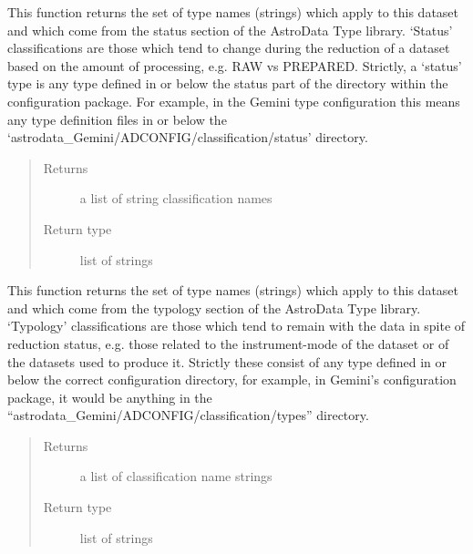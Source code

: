 \documentclass[letterpaper,10pt,english]{sphinxmanual}
\begin{document}

\begin{fulllineitems}
\label{chapter_AstroDataClass:astrodata.data.AstroData.get_status}
This function returns the set of type names (strings) which apply to
this dataset and which come from the status section of the AstroData
Type library. `Status' classifications are those which tend to change
during the reduction of a dataset based on the amount of processing,
e.g. RAW vs PREPARED.  Strictly, a `status' type 
is any type defined in or below the status part of the 
 directory within the 
configuration package. For example, in the Gemini type configuration 
this means any type 
definition files in or below the 
`astrodata\_Gemini/ADCONFIG/classification/status' directory.
\begin{quote}\begin{description}
\item[{Returns}] \leavevmode
a list of string classification names

\item[{Return type}] \leavevmode
list of strings

\end{description}\end{quote}

\end{fulllineitems}


\begin{fulllineitems}
\label{chapter_AstroDataClass:astrodata.data.AstroData.get_typology}
This function returns the set of type names (strings) which apply to
this dataset and which come from the typology section of the AstroData
Type library. `Typology' classifications are those which tend to remain
with the data in spite of reduction status, e.g. those related to the
instrument-mode of the dataset or of the datasets used to produce
it. Strictly these consist of any type defined in or below
the correct configuration directory, for example, in Gemini's configuration
package, it would be anything in the
``astrodata\_Gemini/ADCONFIG/classification/types''  directory.
\begin{quote}\begin{description}
\item[{Returns}] \leavevmode
a list of classification name strings

\item[{Return type}] \leavevmode
list of strings

\end{description}\end{quote}

\end{fulllineitems}
\end{document}
